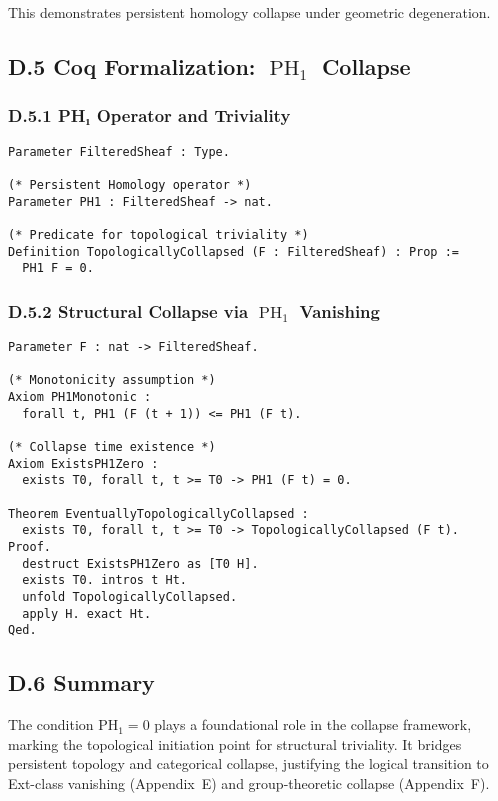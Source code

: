 \documentclass[11pt]{article}
\DeclareMathOperator{\PH}{PH}
\begin{document}
This demonstrates persistent homology collapse under geometric degeneration.

\subsection*{D.5 Coq Formalization: \(\PH_1\) Collapse}

\subsubsection*{D.5.1 PH₁ Operator and Triviality}

\begin{lstlisting}[language=Coq, caption=Persistent Homology Collapse Predicate, captionpos=b]
Parameter FilteredSheaf : Type.

(* Persistent Homology operator *)
Parameter PH1 : FilteredSheaf -> nat.

(* Predicate for topological triviality *)
Definition TopologicallyCollapsed (F : FilteredSheaf) : Prop :=
  PH1 F = 0.
\end{lstlisting}

\subsubsection*{D.5.2 Structural Collapse via \(\PH_1\) Vanishing}

\begin{lstlisting}[language=Coq, caption=\(\PH_1\) Collapse Implication, captionpos=b]
Parameter F : nat -> FilteredSheaf.

(* Monotonicity assumption *)
Axiom PH1Monotonic :
  forall t, PH1 (F (t + 1)) <= PH1 (F t).

(* Collapse time existence *)
Axiom ExistsPH1Zero :
  exists T0, forall t, t >= T0 -> PH1 (F t) = 0.

Theorem EventuallyTopologicallyCollapsed :
  exists T0, forall t, t >= T0 -> TopologicallyCollapsed (F t).
Proof.
  destruct ExistsPH1Zero as [T0 H].
  exists T0. intros t Ht.
  unfold TopologicallyCollapsed.
  apply H. exact Ht.
Qed.
\end{lstlisting}

\subsection*{D.6 Summary}

The condition \( \mathrm{PH}_1 = 0 \) plays a foundational role in the collapse framework, marking the topological initiation point for structural triviality. It bridges persistent topology and categorical collapse, justifying the logical transition to Ext-class vanishing (Appendix~E) and group-theoretic collapse (Appendix~F).
\end{document}
